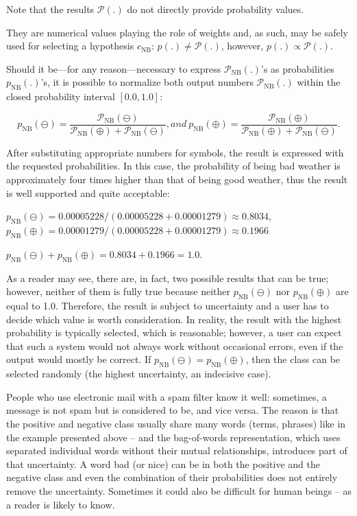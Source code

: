Note that the results $\mathcal{P}(.)$ do not directly provide probability values.

They are numerical values playing the role of weights and, as such, may be 
safely used for selecting a hypothesis $c_{\text{NB}}$: 
$p(.) \neq \mathcal{P}(.)$, however, $p(.) \propto \mathcal{P}(.)$.

Should it be—for any reason—necessary to express $\mathcal{P}_{\text{NB}}(.)$'s as probabilities $p_{\text{NB}}(.)$'s, 
it is possible to normalize both output numbers $\mathcal{P}_{\text{NB}}(.)$ 
within the closed probability interval $[0.0,1.0]$:

$$
p_{\text{NB}}(\ominus) = \frac{\mathcal{P}_{\text{NB}}(\ominus)}
{\mathcal{P}_{\text{NB}}(\oplus) + \mathcal{P}_{\text{NB}}(\ominus)}, and \
p_{\text{NB}}(\oplus) = \frac{\mathcal{P}_{\text{NB}}(\oplus)}
{\mathcal{P}_{\text{NB}}(\oplus) + \mathcal{P}_{\text{NB}}(\ominus)}.
$$

After substituting appropriate numbers for symbols, the result is expressed
with the requested probabilities. In this case, the probability of being bad weather
is approximately four times higher than that of being good weather, thus the
result is well supported and quite acceptable:

$p_{\text{NB}}(\ominus) = 0.00005228 / (0.00005228 + 0.00001279) \approx 0.8034$,  
$p_{\text{NB}}(\oplus) = 0.00001279 / (0.00005228 + 0.00001279) \approx 0.1966$

$p_{\text{NB}}(\ominus) + p_{\text{NB}}(\oplus) = 0.8034 + 0.1966 = 1.0$.

As a reader may see, there are, in fact, two possible results that can be true; 
however, neither of them is fully true because neither $p_{\text{NB}}(\ominus)$ 
nor $p_{\text{NB}}(\oplus)$ are equal to 1.0. Therefore, the result is subject to 
uncertainty and a user has to decide which value is worth consideration. 
In reality, the result with the highest probability is typically selected, which is reasonable; 
however, a user can expect that such a system would not always work without occasional errors, 
even if the output would mostly be correct. If $p_{\text{NB}}(\ominus) = p_{\text{NB}}(\oplus)$, 
then the class can be selected randomly (the highest uncertainty, an indecisive case).

People who use electronic mail with a spam filter know it well: sometimes,
a message is not spam but is considered to be, and vice versa. The reason is that
the positive and negative class usually share many words (terms, phrases) like in
the example presented above – and the bag-of-words representation, which uses
separated individual words without their mutual relationships, introduces part of
that uncertainty. A word bad (or nice) can be in both the positive and the negative
class and even the combination of their probabilities does not entirely remove the
uncertainty. Sometimes it could also be difficult for human beings – as a reader
is likely to know.

